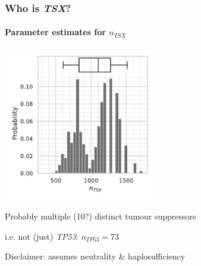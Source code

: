 \documentclass{beamer}
\begin{document}
\begin{frame}
    \frametitle{Who is \emph{TSX}?}
    \framesubtitle{Parameter estimates for $n_{TSX}$}

    \begin{center}
        \includegraphics[width=0.5\textwidth]{figures/TSXhistogram}
    \end{center}

    \begin{center}
        \small{Probably multiple (10?) distinct tumour suppressors} 

        \;

        \huge{i.e. not (just) \emph{TP53}: $n_{TP53} = 73$}

        \;

        \small{Disclaimer: assumes neutrality \& haplosufficiency}
    \end{center}

\end{frame}
\end{document}
